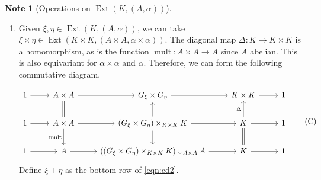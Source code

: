 \documentclass[10pt,letterpaper,cm]{nupset}
\theoremstyle{definition}
\newtheorem{note}[definition]{Note}
\theoremstyle{theorem}
\theoremstyle{remark}
\newcommand{\1}{\mathbf{1}}
\newcommand{\0}{\vec 0}
\DeclareMathOperator{\mult}{mult}
\DeclareMathOperator{\ext}{Ext}
\begin{document}
\begin{note}[Operations on $\ext(K, (A, \alpha))$]
\begin{enumerate}[label=(\arabic*)]
\begin{proof}
Finally, observe that 
\begin{align*}
\ker(G\ltimes_{\beta \circ q} B \twoheadrightarrow K) & = \left\{(g, b) : q(g) =e\right\} 
\\ & = \left\{(g, b) : g \in A\right\}
\\ &  \geq A\times \left\{e\right\} \cong A.\end{align*}
\end{proof}
Now, let $G_{\psi_{\ast}\xi}$ denote $G \cup_A B$, which equals $\faktor{G\ltimes_{\beta \circ q} B}{(i\times \psi)(A)}.$ 
We have obtained a commutative diagram.
\[ \label{eqn:cd}
\begin{tikzcd}
1 \arrow[r] & A \arrow[d, hook] \arrow[r] & G \arrow[d, hook] \arrow[r] & K \arrow[d, equal] \arrow[r] & 1 \\
1 \arrow[r] & A\times B \arrow[r, "i"] \arrow[d, two heads] & G \ltimes_{\beta \circ q} B \arrow[r, "q"] \arrow[d, two heads] & K \arrow[r] \arrow[d, equal] & 1 \\
1 \arrow[r] & \underbrace{B}_{\faktor{A\times B}{(i\times \psi)(A)}} \arrow[r] & G_{\psi_{\ast}\xi} \arrow[r] & K \arrow[r] & 1
\end{tikzcd}, \tag{B}
\]
where $B \cong \faktor{A\times B}{(i\times \psi)(A)}$ via the mapping $b \mapsto \left[(e, b)\right]$. 

Let $\psi_{\ast}$ denote the induced map $G \to G_{\psi_{\ast} \xi}$. Define the extension $\psi_{\ast}\xi$ as the bottom row of \eqref{eqn:cd}.

\item Given $\xi, \eta \in \ext(K, (A, \alpha))$, we can take $\xi \times \eta \in \ext(K \times K, (A\times A, \alpha \times \alpha))$. The diagonal map $\Delta : K \to K \times K$ is a homomorphism, as is the function $\mult: A \times A \to A$ since $A$ abelian. This is also equivariant for $\alpha \times \alpha$ and $\alpha$.
Therefore, we can form the following commutative diagram.

\[ \label{eqn:cd2}
\begin{tikzcd}
1 \arrow[r] & A\times A \arrow[r] & G_{\xi}\times G_{\eta} \arrow[r] & K\times K \arrow[r] & 1 \\
1 \arrow[r] & A\times A \arrow[r] \arrow[d, "\mult"'] \arrow[u, equal] & \left(G_{\xi} \times G_{\eta}\right) \times_{K\times K} K \arrow[r] \arrow[u] \arrow[d] & K \arrow[r] \arrow[u, "\Delta"] \arrow[d, equal] & 1 \\
1 \arrow[r] & A \arrow[r] & \left(\left(G_{\xi} \times G_{\eta}\right) \times_{K\times K} K\right) \cup_{A\times A} A \arrow[r] & K \arrow[r] & 1
\end{tikzcd} \tag{C}
\]
Define $\xi + \eta$ as the bottom row of \eqref{eqn:cd2}.
\end{enumerate}
\end{note}
\end{document}
